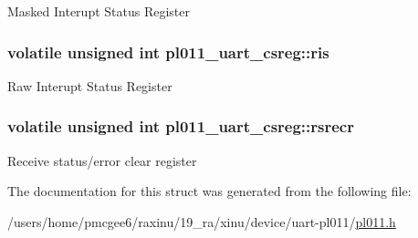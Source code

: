 Masked Interupt Status Register \hypertarget{structpl011__uart__csreg_a6b13c9328a5456cc564b718a1767aad9}{
\subsubsection[{ris}]{\setlength{\rightskip}{0pt plus 5cm}volatile unsigned int pl011\-\_\-uart\-\_\-csreg\-::ris}}\label{structpl011__uart__csreg_a6b13c9328a5456cc564b718a1767aad9}
Raw Interupt Status Register \hypertarget{structpl011__uart__csreg_a17ec77f318b87b8f7563508245e18438}{
\subsubsection[{rsrecr}]{\setlength{\rightskip}{0pt plus 5cm}volatile unsigned int pl011\-\_\-uart\-\_\-csreg\-::rsrecr}}\label{structpl011__uart__csreg_a17ec77f318b87b8f7563508245e18438}
Receive status/error clear register 

The documentation for this struct was generated from the following file\-:\begin{DoxyCompactItemize}
\item 
/users/home/pmcgee6/raxinu/19\-\_\-ra/xinu/device/uart-\/pl011/\hyperlink{pl011_8h}{pl011.\-h}\end{DoxyCompactItemize}
